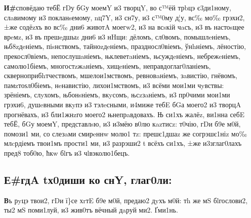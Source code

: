 \textbf{И\#}сповёдаю тебЁ гDу бGу моемY и3 творцY, во с™ёй трbцэ є3ди1ному,
слaвимому и3 покланsемому, nц7Y, и3 сн7у, и3 с™0му д¦у, вс‰ мо‰ грэхи2,
±же содёzхъ во вс‰ дни6 животA моегw2, и3 на всsкій чaсъ, и3 въ
настоsщее врeмz, и3 въ прешeдшыz дни6 и3 нHщи: дёломъ, сл0вомъ,
помышлeніемъ, њб8zдeніемъ, піsнствомъ, тайноzдeніемъ, праздносл0віемъ,
ўнhніемъ, лёностію, прекосл0віемъ, непослушaніемъ, њклеветaніемъ,
њсуждeніемъ, небрежeніемъ, самолю1біемъ, многостzжaніемъ, хищeніемъ,
неправдоглаг0ланіемъ, скверноприбhтчествомъ, мшелои1мствомъ,
ревновaніемъ, зaвистію, гнёвомъ, памzтоѕл0біемъ, нeнавистію,
лихои1мствомъ, и3 всёми мои1ми чyвствы: зрёніемъ, слyхомъ, њбонsніемъ,
вкyсомъ, њсzзaніемъ, и3 пр0чими мои1ми грэхи6, душeвными вкyпэ и3
тэлeсными, и4миже тебE бGа моего2 и3 творцA прогнёвахъ, и3 бли1жнzго
моего2 њнепрaвдовахъ. Њ си1хъ жалёz, ви1нна себE тебЁ, бGу моемY,
представлsю, и3 и3мёю в0лю кazтисz: т0чію, гDи б9е м0й, помози1 ми, со
слезaми смирeннw молю1 тz: прешє1дшаz же согрэшє1ніz мо‰ млcрдіемъ
твои1мъ прости1 ми, и3 разрэши2 t всёхъ си1хъ, ±же и3зглаг0лахъ пред8
тоб0ю, ћкw бlгъ и3 чlвэколю1бецъ.

\subsection[Егда отходиши ко сну, глаголи]
{Е\#гдA tх0диши ко снY, глаг0ли:}

\textbf{В}ъ рyцэ твои2, гDи ї\}се хrтE б9е м0й, предаю2 дyхъ м0й: тh же мS
бlгослови2, ты2 мS поми1луй, и3 жив0тъ вёчный дaруй ми2. Ґми1нь.
